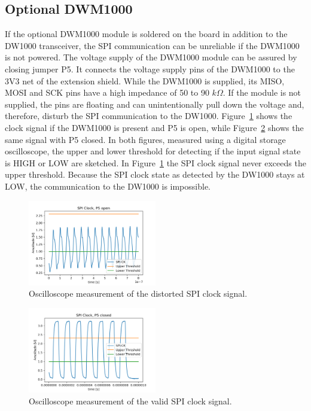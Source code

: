 \documentclass[journal,comsoc]{IEEEtran}
\begin{document}
\subsection{Optional DWM1000}
\label{subsec:optionaldw1000}
If the optional DWM1000 module is soldered on the board in addition to the DW1000 transceiver, the SPI communication can be unreliable if the DWM1000 is not powered.
The voltage supply of the DWM1000 module can be assured by closing jumper P5. 
It connects the voltage supply pins of the DWM1000 to the 3V3 net of the extension shield. While the DWM1000 is supplied, its MISO, MOSI and SCK pins have a high impedance of 50 to 90 $k\Omega$. 
If the module is not supplied, the pins are floating and can unintentionally pull down the voltage and, therefore, disturb the SPI communication to the DW1000.
Figure~\ref{fig:badspiclk} shows the clock signal if the DWM1000 is present and P5 is open, while Figure~\ref{fig:goodspiclk} shows the same signal with P5 closed.
In both figures, measured using a digital storage oscilloscope, the upper and lower threshold for detecting if the input signal state is HIGH or LOW are sketched.
In Figure~\ref{fig:badspiclk} the SPI clock signal never exceeds the upper threshold.
Because the SPI clock state as detected by the DW1000 stays at LOW, the communication to the DW1000 is impossible.
\begin{figure}[h!]
	\centering
	\includegraphics[width=0.5\textwidth]{Figures/sck_bare_init}
	\caption{Oscilloscope measurement of the distorted SPI clock signal.}
	\label{fig:badspiclk}
\end{figure}
\begin{figure}[h!]
	\centering
	\includegraphics[width=0.5\textwidth]{Figures/sck_contiki_txrx}
	\caption{Oscilloscope measurement of the valid SPI clock signal.}
	\label{fig:goodspiclk}
\end{figure}
\end{document}
